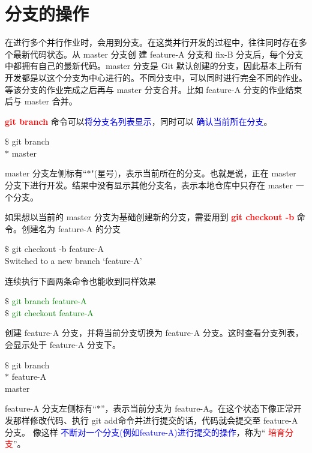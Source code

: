 \documentclass[12pt,a4paper]{article}
\begin{document}
\section{分支的操作}
在进行多个并行作业时，会用到分支。在这类并行开发的过程中，往往同时存在多个最新代码状态。从 master 分支创
建 feature-A 分支和 fix-B 分支后，每个分支中都拥有自己的最新代码。master 分支是 Git 默认创建的分支，因此基本上所有开发都是以这个分支为中心进行的。不同分支中，可以同时进行完全不同的作业。等该分支的作业完成之后再与 master 分支合并。比如 feature-A 分支的作业结束后与 master 合并。

\textcolor{red}{\bf git branch} 命令可以\textcolor{blue}{将分支名列表显示}，同时可以 \textcolor{blue}{确认当前所在分支}。
\begin{tcolorbox}[colback=green!5,colframe=green!40!black,title= ]
$\$$ git branch \\
$\ast$ master
\end{tcolorbox}
master 分支左侧标有``$\ast$"(星号)，表示当前所在的分支。也就是说，正在 master 分支下进行开发。结果中没有显示其他分支名，表示本地仓库中只存在 master 一个分支。

如果想以当前的 master 分支为基础创建新的分支，需要用到 \textcolor{red}{\bf git checkout -b} 命令。创建名为 feature-A 的分支
\begin{tcolorbox}[colback=green!5,colframe=green!40!black,title= ]
$\$$ git checkout -b feature-A \\
Switched to a new branch `feature-A'
\end{tcolorbox}
连续执行下面两条命令也能收到同样效果
\begin{tcolorbox}[colback=green!5,colframe=green!40!black,title= ]
$\$$ \textcolor{green}{git branch feature-A} \\
$\$$ \textcolor{green}{git checkout feature-A}
\end{tcolorbox}
创建 feature-A 分支，并将当前分支切换为 feature-A 分支。这时查看分支列表，会显示处于 feature-A 分支下。
\begin{tcolorbox}[colback=green!5,colframe=green!40!black,title= ]
$\$$ git branch \\
$\ast$ feature-A \\
master 
\end{tcolorbox}
feature-A 分支左侧标有``$\ast$”，表示当前分支为 feature-A。在这个状态下像正常开发那样修改代码、执行 git add命令并进行提交的话，代码就会提交至 feature-A 分支。 像这样 \textcolor{blue}{不断对一个分支(例如feature-A)进行提交的操作}，称为`` \textcolor{red}{培育分支}”。
\end{document}
